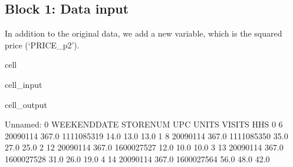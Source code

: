 \documentclass[letterpaper,10pt,english]{jupyterBook}
\begin{document}
\subsection{Block 1: Data input}
\label{\detokenize{docs/Case1_2_Module1A_Retail_Demand_Model:block-1-data-input}}
\sphinxAtStartPar
In addition to the original data, we add a new variable, which is the squared price (‘PRICE\_p2’).

\begin{sphinxuseclass}{cell}\begin{sphinxVerbatimInput}

\begin{sphinxuseclass}{cell_input}
\begin{sphinxVerbatim}[commandchars=\\\{\}]
  

  
\PYG{p}{[}\PYG{p}{]}  \PYG{p}{[}\PYG{p}{]}
\end{sphinxVerbatim}

\end{sphinxuseclass}\end{sphinxVerbatimInput}
\begin{sphinxVerbatimOutput}

\begin{sphinxuseclass}{cell_output}
\begin{sphinxVerbatim}[commandchars=\\\{\}]
   Unnamed: 0 WEEK\PYGZus{}END\PYGZus{}DATE  STORE\PYGZus{}NUM         UPC  UNITS  VISITS   HHS  \PYGZbs{}
0           6    2009\PYGZhy{}01\PYGZhy{}14      367.0  1111085319   14.0    13.0  13.0   
1           8    2009\PYGZhy{}01\PYGZhy{}14      367.0  1111085350   35.0    27.0  25.0   
2          12    2009\PYGZhy{}01\PYGZhy{}14      367.0  1600027527   12.0    10.0  10.0   
3          13    2009\PYGZhy{}01\PYGZhy{}14      367.0  1600027528   31.0    26.0  19.0   
4          14    2009\PYGZhy{}01\PYGZhy{}14      367.0  1600027564   56.0    48.0  42.0   


\end{sphinxVerbatim}
\end{sphinxuseclass}
\end{sphinxVerbatimOutput}
\end{sphinxuseclass}
\end{document}
